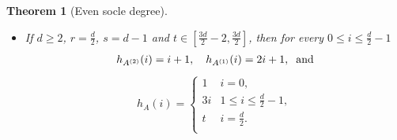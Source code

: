 \documentclass[12pt]{amsart}
\numberwithin{equation}{section}
\theoremstyle{plain} \newtheorem{theorem}{Theorem}[section]
\theoremstyle{definition} \newtheorem{definition}[theorem]{Definition}
\begin{document}
\begin{theorem}[Even socle degree]
\begin{itemize}
\begin{itemize}
\item otherwise, i.e., $t>3r$ we have
\begin{equation}\label{HFevenA(1)o.w.}
h_{A}(i)=\left\{
                \begin{array}{ll}
                   1 & i=0,\\
                  3i &  1\leq i\leq r,\\
                 2i+r+1 & r+1\leq i\leq s-r-1,\\
                 2i+r+1& i=s-r, \hspace*{2mm}\text{if}\hspace*{2mm}t>2s-r\hspace*{2mm}\text{and}\hspace*{2mm}s>2r,\\
                  2i+r& i=s-r, \hspace*{2mm}\text{if}\hspace*{2mm}t>2s-r \hspace*{2mm}\text{and}\hspace*{2mm}s=2r,\\
                 i+s+1 &s-r+1\leq i\leq t-s-1,\\
                 t & t-s \leq i\leq \frac{d}{2}.
                \end{array}
              \right.
 \end{equation}
 \end{itemize}
 \item[$(2)$]
If $d\geq 2$, $r=\frac{d}{2}$, $s=d-1$ and $t\in[\frac{3d}{2}-2,\frac{3d}{2}]$, 
then for every  $0\leq i\leq \frac{d}{2}-1$
 \begin{align}\label{HFeven(2)}
  h_{A^{(2)}}(i)=i+1,\quad  h_{A^{(1)}}(i)=2i+1, \hspace*{2mm}\text{and}
 \end{align}
  \begin{align}\label{HFevenA(2.1)}
 h_{A}(i)=\left\{
                \begin{array}{ll}
                 1 & i=0,\\
                  3i &  1\leq i\leq \frac{d}{2}-1,\\
                   t &  i=\frac{d}{2}.\\
                \end{array}
              \right.
  \end{align}
    \end{itemize}
\end{theorem}
\end{document}
